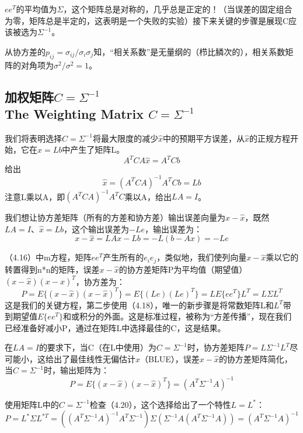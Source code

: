 	$ee^T$的平均值为$\Sigma$，这个矩阵总是对称的，几乎总是正定的！（当误差的固定组合为零，矩阵总是半定的，这表明是一个失败的实验）接下来关键的步骤是展现C应该被选为$\Sigma^{-1}$。
	
	从协方差的$p_{ij}=\sigma_{ij}/\sigma_i\sigma_j$知，“相关系数”是无量纲的（栉比鳞次的），相关系数矩阵的对角项为$\sigma^2/\sigma^2=1$。
	
	\subsection[加权矩阵$C=\Sigma^{-1}$]{加权矩阵$C=\Sigma^{-1}$ \\ The Weighting Matrix $C=\Sigma^{-1}$}
	我们将表明选择$C=\Sigma^{-1}$将最大限度的减少$\hat{x}$中的预期平方误差，从$\hat{x}$的正规方程开始，它在$\hat{x}=Lb$中产生了矩阵L。
	\begin{equation}
	A^TCA\hat{x}=A^TCb
	\end{equation}
	给出
	\begin{equation*}
	\hat{x}=(A^TCA)^{-1}A^TCb=Lb
	\end{equation*}
	注意L乘以A，即$(A^TCA)^{-1}A^TC$乘以A，给出$LA=I$。
	
	我们想让协方差矩阵（所有的方差和协方差）输出误差向量为$x-\hat{x}$，既然$LA=I、\hat{x}=Lb$，这个输出误差为$-Le$，输出误差为：
	\begin{equation}
	x-\hat{x}=LAx-Lb=-L(b-Ax)=-Le
	\end{equation}
	
	（4.16）中m方程，矩阵$ee^T$产生所有的$e_ie_j$，类似地，我们使列向量$x-\hat{x}$乘以它的转置得到n*n的矩阵，误差$x-\hat{x}$的协方差矩阵P为平均值（期望值）$(x-\hat{x})(x-\hat{x})^T$，协方差为：
	\begin{equation}
	P=E\{(x-\hat{x})(x-\hat{x})^T\}=E\{(Le)(Le)^T\}=LE\{ee^T\}L^T=L\Sigma L^T
	\end{equation}
	这是我们的关键方程，第二步使用（4.18），唯一的新步骤是将常数矩阵L和$L^T$带到期望值$E\{ee^T\}$和或积分的外面。这是标准过程，被称为“方差传播”，现在我们已经准备好减小P，通过在矩阵L中选择最佳的C，这是结果。
	
	在$LA=I$的要求下，当C（在L中使用）为$C=\Sigma^{-1}$时，协方差矩阵$P=L\Sigma^{-1}L^T$尽可能小，这给出了最佳线性无偏估计$\hat{x}$（BLUE），误差$x-\hat{x}$的协方差矩阵简化，当$C=\Sigma^{-1}$时，输出矩阵为：
	\begin{equation}
	P=E\{(x-\hat{x})(x-\hat{x})^T\}=(A^T\Sigma^{-1}A)^{-1}
	\end{equation}
	
	使用矩阵L中的$C=\Sigma^{-1}$检查（4.20），这个选择给出了一个特性$L=L^*$：
	\begin{equation}
	P=L^*\Sigma L^{*T}=((A^T\Sigma^{-1}A)^{-1}A^T\Sigma^{-1})\Sigma(\Sigma^{-1}A(A^T\Sigma^{-1}A))=(A^T\Sigma^{-1}A)^{-1}
	\end{equation}
	
